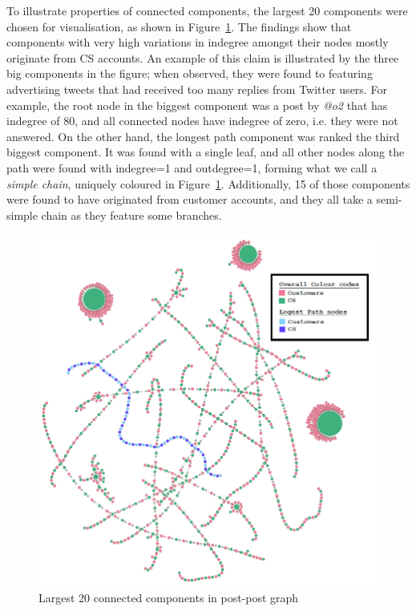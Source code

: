 \documentclass[sigconf]{acmart}
\begin{document}
{To illustrate properties of connected components, the largest 20
components were chosen for visualisation, as shown in
Figure~\ref{fig:20ccpostpostgraph}. The findings show that components
with very high variations in indegree amongst their nodes mostly
originate from CS accounts. An example of this claim is illustrated by
the three big components in the figure; when observed, they were found
to featuring advertising tweets that had received too many replies
from Twitter users.  For example, the root node in the biggest
component was a post by {\emph{@o2}} that has indegree of 80, and all
connected nodes have indegree of zero, i.e. they were not answered. On
the other hand, the longest path component was ranked the third
biggest component. It was found with a single leaf, and all other
nodes along the path were found with indegree=1 and outdegree=1,
forming what we call a {\emph{simple chain}}, uniquely coloured in
Figure~\ref{fig:20ccpostpostgraph}. Additionally, 15 of those
components were found to have originated from customer accounts, and
they all take a semi-simple chain as they feature some branches.

\begin{figure}[htb]
\centering
\includegraphics[width=\columnwidth]{images/20ccpostpostgraph.png}
\caption{Largest 20 connected components in post-post graph}
\label{fig:20ccpostpostgraph}
\end{figure}

}
\end{document}
